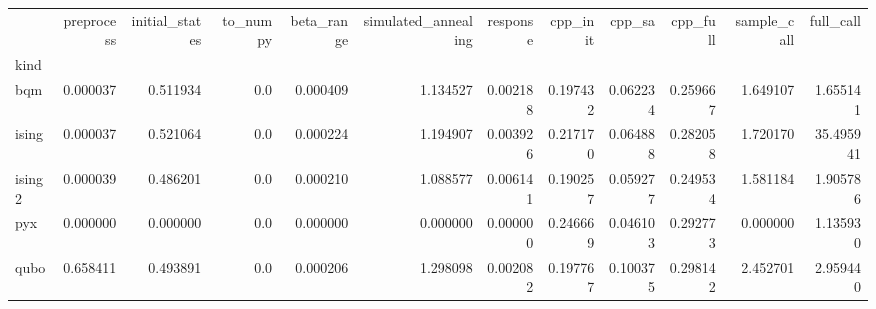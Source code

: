 \begin{tabular}{lrrrrrrrrrrr}
\toprule
{} &  preprocess &  initial\_states &  to\_numpy &  beta\_range &  simulated\_annealing &  response &  cpp\_init &    cpp\_sa &  cpp\_full &  sample\_call &  full\_call \\
kind   &             &                 &           &             &                      &           &           &           &           &              &            \\
\midrule
bqm    &    0.000037 &        0.511934 &       0.0 &    0.000409 &             1.134527 &  0.002188 &  0.197432 &  0.062234 &  0.259667 &     1.649107 &   1.655141 \\
ising  &    0.000037 &        0.521064 &       0.0 &    0.000224 &             1.194907 &  0.003926 &  0.217170 &  0.064888 &  0.282058 &     1.720170 &  35.495941 \\
ising2 &    0.000039 &        0.486201 &       0.0 &    0.000210 &             1.088577 &  0.006141 &  0.190257 &  0.059277 &  0.249534 &     1.581184 &   1.905786 \\
pyx    &    0.000000 &        0.000000 &       0.0 &    0.000000 &             0.000000 &  0.000000 &  0.246669 &  0.046103 &  0.292773 &     0.000000 &   1.135930 \\
qubo   &    0.658411 &        0.493891 &       0.0 &    0.000206 &             1.298098 &  0.002082 &  0.197767 &  0.100375 &  0.298142 &     2.452701 &   2.959440 \\
\bottomrule
\end{tabular}
